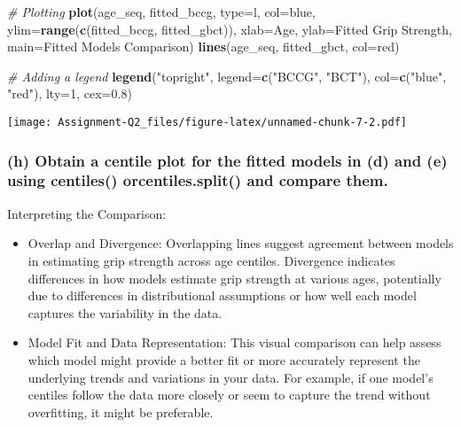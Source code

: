 \documentclass[
]{article}
\newenvironment{Shaded}{\begin{snugshade}}{\end{snugshade}}
\newcommand{\AttributeTok}[1]{\textcolor[rgb]{0.13,0.29,0.53}{#1}}
\newcommand{\CommentTok}[1]{\textcolor[rgb]{0.56,0.35,0.01}{\textit{#1}}}
\newcommand{\DecValTok}[1]{\textcolor[rgb]{0.00,0.00,0.81}{#1}}
\newcommand{\FloatTok}[1]{\textcolor[rgb]{0.00,0.00,0.81}{#1}}
\newcommand{\FunctionTok}[1]{\textcolor[rgb]{0.13,0.29,0.53}{\textbf{#1}}}
\newcommand{\NormalTok}[1]{#1}
\newcommand{\StringTok}[1]{\textcolor[rgb]{0.31,0.60,0.02}{#1}}
\begin{document}
\begin{Shaded}
\begin{Highlighting}[]
\CommentTok{\# Plotting}
\FunctionTok{plot}\NormalTok{(age\_seq, fitted\_bccg, }\AttributeTok{type=}\StringTok{\textquotesingle{}l\textquotesingle{}}\NormalTok{, }\AttributeTok{col=}\StringTok{\textquotesingle{}blue\textquotesingle{}}\NormalTok{, }\AttributeTok{ylim=}\FunctionTok{range}\NormalTok{(}\FunctionTok{c}\NormalTok{(fitted\_bccg, fitted\_gbct)),}
     \AttributeTok{xlab=}\StringTok{\textquotesingle{}Age\textquotesingle{}}\NormalTok{, }\AttributeTok{ylab=}\StringTok{\textquotesingle{}Fitted Grip Strength\textquotesingle{}}\NormalTok{, }\AttributeTok{main=}\StringTok{\textquotesingle{}Fitted Models Comparison\textquotesingle{}}\NormalTok{)}
\FunctionTok{lines}\NormalTok{(age\_seq, fitted\_gbct, }\AttributeTok{col=}\StringTok{\textquotesingle{}red\textquotesingle{}}\NormalTok{)}

\CommentTok{\# Adding a legend}
\FunctionTok{legend}\NormalTok{(}\StringTok{"topright"}\NormalTok{, }\AttributeTok{legend=}\FunctionTok{c}\NormalTok{(}\StringTok{"BCCG"}\NormalTok{, }\StringTok{"BCT"}\NormalTok{), }\AttributeTok{col=}\FunctionTok{c}\NormalTok{(}\StringTok{"blue"}\NormalTok{, }\StringTok{"red"}\NormalTok{), }\AttributeTok{lty=}\DecValTok{1}\NormalTok{, }\AttributeTok{cex=}\FloatTok{0.8}\NormalTok{)}
\end{Highlighting}
\end{Shaded}

\texttt{[image: Assignment-Q2\_files/figure-latex/unnamed-chunk-7-2.pdf]}

\hypertarget{h-obtain-a-centile-plot-for-the-fitted-models-in-d-and-e-using-centiles-orcentiles.split-and-compare-them.}{%
\subsubsection{(h) Obtain a centile plot for the fitted models in (d)
and (e) using centiles() orcentiles.split() and compare
them.}\label{h-obtain-a-centile-plot-for-the-fitted-models-in-d-and-e-using-centiles-orcentiles.split-and-compare-them.}}

Interpreting the Comparison:

\begin{itemize}
\item
  Overlap and Divergence: Overlapping lines suggest agreement between
  models in estimating grip strength across age centiles. Divergence
  indicates differences in how models estimate grip strength at various
  ages, potentially due to differences in distributional assumptions or
  how well each model captures the variability in the data.
\item
  Model Fit and Data Representation: This visual comparison can help
  assess which model might provide a better fit or more accurately
  represent the underlying trends and variations in your data. For
  example, if one model's centiles follow the data more closely or seem
  to capture the trend without overfitting, it might be preferable.
\end{itemize}
\end{document}
